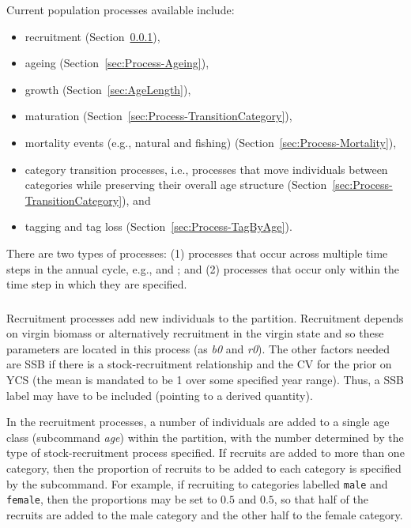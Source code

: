 Current population processes available include:

\begin{itemize}
\item recruitment (Section~\ref{sec:Process-Recruitment}),
\item ageing (Section~\ref{sec:Process-Ageing}),
\item growth (Section~\ref{sec:AgeLength}),
\item maturation (Section~\ref{sec:Process-TransitionCategory}),
\item mortality events (e.g., natural and fishing) (Section~\ref{sec:Process-Mortality}), 
\item category transition processes, i.e., processes that move individuals between categories while preserving their overall age structure (Section~\ref{sec:Process-TransitionCategory}), and
\item tagging and tag loss (Section~\ref{sec:Process-TagByAge}).
\end{itemize}

There are two types of processes: (1) processes that occur across multiple time steps in the annual cycle, e.g.,  and ; and (2) processes that occur only within the time step in which they are specified.

\subsubsection{}\label{sec:Process-Recruitment}

Recruitment processes  add new individuals to the partition. Recruitment depends on virgin biomass or alternatively recruitment in the virgin state and so these parameters are located in this process (as \textit{b0} and \textit{r0}). The other factors needed are SSB if there is a stock-recruitment relationship and the CV for the prior on YCS (the mean is mandated to be 1 over some specified year range). Thus, a SSB label may have to be included (pointing to a derived quantity).

In the recruitment processes, a number of individuals are added to a single age class (subcommand \textit{age}) within the partition, with the number determined by the type of stock-recruitment process specified. If recruits are added to more than one category, then the proportion of recruits to be added to each category is specified by the  subcommand. For example, if recruiting to categories labelled \texttt{male} and \texttt{female}, then the proportions may be set to $0.5$ and $0.5$, so that half of the recruits are added to the male category and the other half to the female category.

